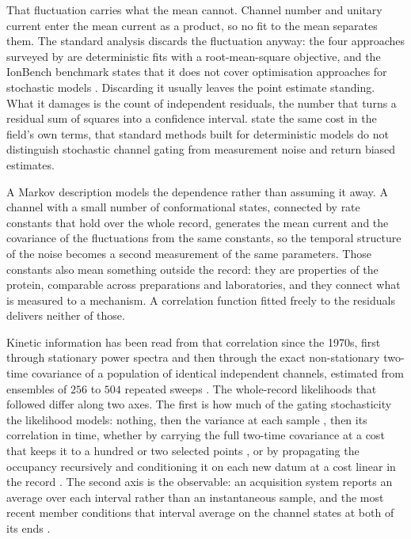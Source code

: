 That fluctuation carries what the mean cannot. Channel number and unitary current enter the mean
current as a product, so no fit to the mean separates them. The standard analysis discards the
fluctuation anyway: the four approaches surveyed by \citet{clerx2019four} are deterministic fits with
a root-mean-square objective, and the IonBench benchmark states that it does not cover optimisation
approaches for stochastic models \citep{owen2025ionbench}. Discarding it usually leaves the point
estimate standing. What it damages is the count of independent residuals, the number that turns a
residual sum of squares into a confidence interval. \citet{delcore2025parameter} state the same cost in the field's own terms, that standard
methods built for deterministic models do not distinguish stochastic channel gating from
measurement noise and return biased estimates.

A Markov description models the dependence rather than assuming it away. A channel with a small
number of conformational states, connected by rate constants that hold over the whole record,
generates the mean current and the covariance of the fluctuations from the same constants, so the
temporal structure of the noise becomes a second measurement of the same parameters. Those constants
also mean something outside the record: they are properties of the protein, comparable across
preparations and laboratories, and they connect what is measured to a mechanism. A correlation
function fitted freely to the residuals delivers neither of those.

Kinetic information has been read from that correlation since the 1970s, first through stationary
power spectra \citep{katz1970membrane,katz1972statistical,anderson1973voltage} and then through the
exact non-stationary two-time covariance of a population of identical independent channels,
estimated from ensembles of $256$ to $504$ repeated sweeps
\citep{conti1980conductance,sigworth1981covariance}. The whole-record likelihoods that followed
differ along two axes. The first is how much of the gating stochasticity the likelihood models:
nothing, then the variance at each sample \citep{milescu2005maximum}, then its correlation in time,
whether by carrying the full two-time covariance at a cost that keeps it to a hundred or two selected
points \citep{celentano2004use}, or by propagating the occupancy recursively and conditioning it on
each new datum at a cost linear in the record
\citep{moffatt2007estimation,stepanyuk2011efficient,munch2022bayesian}. The second axis is the
observable: an acquisition system reports an average over each interval rather than an instantaneous
sample, and the most recent member conditions that interval average on the channel states at both of
its ends \citep{moffatt2025bayesian}.

